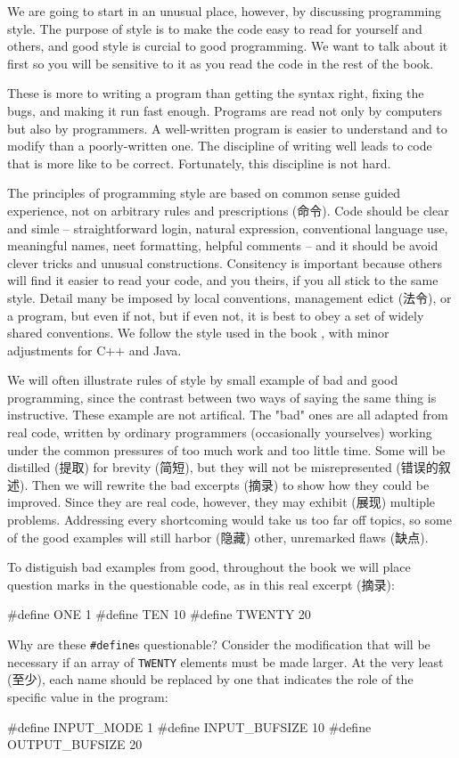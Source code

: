 We are going to start in an unusual place, however, by discussing
programming style. The purpose of style is to make the code easy to read
for yourself and others, and good style is curcial to good programming. We
want to talk about it first so you will be sensitive to it as you read the
code in the rest of the book.

These is more to writing a program than getting the syntax right, fixing
the bugs, and making it run fast enough. Programs are read not only by
computers but also by programmers. A well-written program is easier to
understand and to modify than a poorly-written one. The discipline of
writing well leads to code that is more like to be correct. Fortunately,
this discipline is not hard.

The principles of programming style are based on common sense guided
experience, not on arbitrary rules and prescriptions (命令). Code should be
clear and simle -- straightforward login, natural expression, conventional
language use, meaningful names, neet formatting, helpful comments -- and it
should be avoid clever tricks and unusual constructions. Consitency is
important because others will find it easier to read your code, and you
theirs, if you all stick to the same style. Detail many be imposed by local
conventions, management edict (法令), or a program, but even if not, but if
even not, it is best to obey a set of widely shared conventions. We follow
the style used in the book , with
minor adjustments for C++ and Java.

We will often illustrate rules of style by small example of bad and good
programming, since the contrast between two ways of saying the same thing
is instructive. These example are not artifical. The "bad" ones are all
adapted from real code, written by ordinary programmers (occasionally
yourselves) working under the common pressures of too much work and too
little time. Some will be distilled (提取) for brevity (简短), but they will
not be misrepresented (错误的叙述). Then we will rewrite the bad
excerpts (摘录) to show how they could be improved. Since they are real
code, however, they may exhibit (展现) multiple problems. Addressing every
shortcoming would take us too far off topics, so some of the good examples
will still harbor (隐藏) other, unremarked flaws (缺点).

To distiguish bad examples from good, throughout the book we will place
question marks in the questionable code, as in this real excerpt (摘录):
\begin{badcode}
    #define ONE 1
    #define TEN 10 
    #define TWENTY  20
\end{badcode}
Why are these \verb"#define"s questionable? Consider the modification that
will be necessary if an array of \verb"TWENTY" elements must be made
larger. At the very least (至少), each name should be replaced by one that
indicates the role of the specific value in the program:
\begin{wellcode}
    #define INPUT_MODE  1
    #define INPUT_BUFSIZE   10
    #define OUTPUT_BUFSIZE  20 
\end{wellcode}

